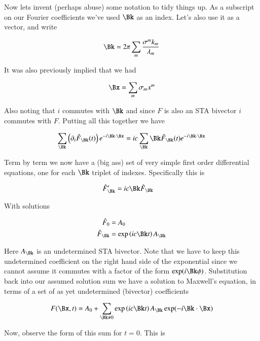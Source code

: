 \documentclass{article}
\begin{document}
Now lets invent (perhaps abuse) some notation to tidy things up.  As a subscript on our Fourier coefficients we've used $\Bk$ as an index.  Let's also use it as a vector, and write

\begin{align*}
\Bk = 2 \pi \sum_m \frac{\sigma^m k_m}{\lambda_m}
\end{align*}

It was also previously implied that we had

\begin{align*}
\Bx = \sum_m \sigma_m x^m
\end{align*}

Also noting that $i$ commutes with $\Bk$ and since $F$ is also an STA bivector $i$ commutes with $F$.  Putting all this together we have

\begin{align*}
\sum_{\Bk} \left(\partial_t \hat{F}_{\Bk}(t) \right) e^{-i \Bk \cdot \Bx }
&= i c \sum_{\Bk} \Bk \hat{F}_{\Bk}(t) e^{- i \Bk \cdot \Bx } \\
\end{align*}

Term by term we now have a (big ass) set of very simple first order differential equations, one for each $\Bk$ triplet of indexes.  Specifically this is

\begin{align*}
\hat{F}_{\Bk}' &= i c \Bk \hat{F}_{\Bk}
\end{align*}

With solutions

\begin{align*}
\hat{F}_{0} &= A_{0} \\
\hat{F}_{\Bk} &= \exp\left(i c \Bk t \right) A_{\Bk} \\
\end{align*}

Here $A_{\Bk}$ is an undetermined STA bivector.  Note that we have to keep this undetermined coefficient on the right hand side of the exponential since we cannot assume it commutes with a factor of the form $\exp(i\Bk\phi)$.  Substitution back into our assumed solution sum we have a solution to Maxwell's equation, in terms of a set of as yet undetermined (bivector) coefficients

\begin{align}
F(\Bx,t) = A_0 + \sum_{\Bk \ne 0} \exp\left(i c \Bk t \right) A_{\Bk} \exp(-i \Bk \cdot \Bx )
\end{align}

Now, observe the form of this sum for $t=0$.  This is
\end{document}
